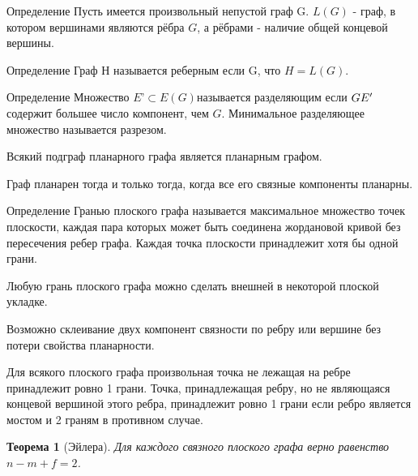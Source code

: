 \documentclass[a4paper,openany]{book}
\newcounter{TheoremCounter}
\newtheorem{theorem}[TheoremCounter]{Теорема}
\newenvironment{definition}
{\begin{statement}{Определение}}
    {\end{statement}}
\begin{document}
\begin{definition}
  Пусть имеется произвольный непустой граф G. $L(G)$ - граф, в котором вершинами
  являются рёбра $G$, а рёбрами - наличие общей концевой вершины.
\end{definition}

\begin{definition}
  Граф Н называется реберным если G, что $H = L(G)$.
\end{definition}

\begin{definition}
  Множество $E’ \subset E(G)$называется разделяющим если $G \\ E'$ содержит
  большее число компонент, чем $G$. Минимальное разделяющее множество называется
  разрезом.
\end{definition}

\begin{stm}
  Всякий подграф планарного графа является планарным графом.
\end{stm}

\begin{stm}
  Граф планарен тогда и только тогда, когда все его связные компоненты планарны.
\end{stm}

\begin{definition}
  Гранью плоского графа называется максимальное множество точек плоскости,
  каждая пара которых может быть соединена жордановой кривой без пересечения
  ребер графа. Каждая точка плоскости принадлежит хотя бы одной грани.
\end{definition}

\begin{stm}
  Любую грань плоского графа можно сделать внешней в некоторой плоской укладке.
\end{stm}

\begin{stm}
  Возможно склеивание двух компонент связности по ребру или вершине без потери
  свойства планарности.
\end{stm}

\begin{stm}
  Для всякого плоского графа произвольная точка не лежащая на ребре принадлежит
  ровно 1 грани. Точка, принадлежащая ребру, но не являющаяся концевой вершиной
  этого ребра, принадлежит ровно 1 грани если ребро является мостом и 2 граням
  в противном случае.
\end{stm}

\begin{theorem}[Эйлера]
  Для каждого связного плоского графа верно равенство $n - m + f = 2$.
\end{theorem}
\end{document}
